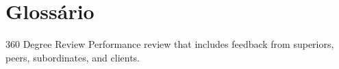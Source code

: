 \section{Glossário}
\begin{Glossary}
\item[360 Degree Review] Performance review that includes feedback from superiors, peers, subordinates, and clients.
\end{Glossary}



